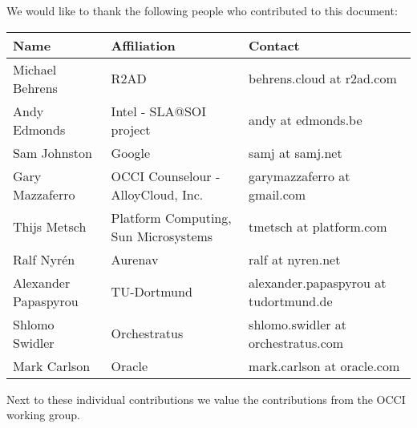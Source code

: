 ﻿
We would like to thank the following people who contributed to this
document:

\begin{tabular}{l|p{2in}|p{2in}}
Name & Affiliation & Contact \\
\hline
Michael Behrens & R2AD & behrens.cloud at r2ad.com \\
Andy Edmonds & Intel - SLA@SOI project & andy at edmonds.be \\
Sam Johnston & Google & samj at samj.net \\
Gary Mazzaferro & OCCI Counselour - AlloyCloud, Inc. &  garymazzaferro at gmail.com \\ 
Thijs Metsch & Platform Computing, Sun Microsystems & tmetsch at platform.com \\
Ralf Nyrén & Aurenav & ralf at nyren.net \\
Alexander Papaspyrou & TU-Dortmund & alexander.papaspyrou at tu\-dortmund.de \\
Shlomo Swidler & Orchestratus & shlomo.swidler at orchestratus.com \\
Mark Carlson & Oracle & mark.carlson at oracle.com \\
\end{tabular}

Next to these individual contributions we value the contributions from
the OCCI working group.
